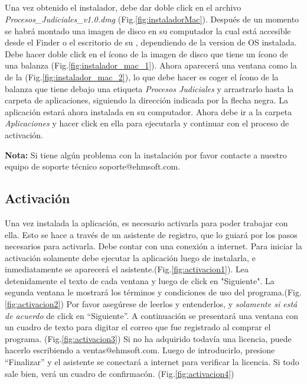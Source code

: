\subsection{\mac}
Una vez obtenido el instalador, debe dar doble click en el archivo \emph{Procesos\_Judiciales\_v1.0.dmg} (Fig.\ref{fig:instaladorMac}). Despu\'es de un momento se habr\'a montado una imagen de disco en su computador la cual est\'a accesible desde el Finder o el escritorio de su \mac, dependiendo de la version de \mac OS instalada. Debe hacer doble click en el \'icono de la imagen de disco que tiene un \'icono de una balanza (Fig.\ref{fig:instalador_mac_1}).
Ahora aparecer\'a una ventana como la de la (Fig.\ref{fig:instalador_mac_2}), lo que debe hacer es coger el \'icono de la balanza que tiene debajo una etiqueta \emph{Procesos Judiciales} y arrastrarlo hasta la carpeta de aplicaciones, siguiendo la direcci\'on indicada por la flecha negra.
La aplicaci\'on estar\'a ahora instalada en su computador. Ahora debe ir a la carpeta \emph{Aplicaciones} y hacer click en ella para ejecutarla y continuar con el proceso de activaci\'on.

\textbf{Nota:} Si tiene alg\'un problema con la instalaci\'on por favor contacte a nuestro equipo de soporte t\'ecnico \mbox{soporte@ehmsoft.com}.
\subsection{Activaci\'on}
Una vez instalada la aplicaci\'on, es necesario activarla para poder trabajar con ella. Esto se hace a trav\'es de un asistente de registro, que lo guiar\'a por los pasos necesarios para activarla. Debe contar con una conexi\'on a internet. Para iniciar la activaci\'on solamente debe ejecutar la aplicaci\'on luego de instalarla, e inmediatamente se aparecer\'a el asistente.(Fig.\ref{fig:activacion1}). Lea detenidamente el texto de cada ventana y luego de click en "Siguiente". La segunda ventana le mostrar\'a los t\'erminos y condiciones de uso del programa.(Fig.\ref{fig:activacion2}) Por favor aseg\'urese de leerlos y entenderlos, y \emph{solamente si est\'a de acuerdo} de click en ``Siguiente''. A continuaci\'on se presentar\'a una ventana con un cuadro de texto para digitar el correo que fue registrado al comprar el programa. (Fig.\ref{fig:activacion3}) Si no ha adquirido todav\'ia una licencia, puede hacerlo escribiendo a \mbox{ventas@ehmsoft.com}. Luego de introducirlo, presione ``Finalizar'' y el asistente se conectar\'a a internet para verificar la licencia. Si todo sale bien, ver\'a un cuadro de confirmac\'on. (Fig.\ref{fig:activacion4}) 

